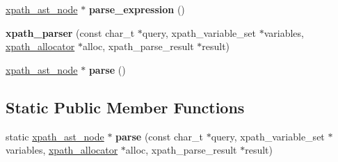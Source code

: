 \begin{DoxyCompactItemize}
\item 
\hypertarget{structxpath__parser_adb814ff3b99621d2a1c8e788ffd1c1c5}{\hyperlink{classxpath__ast__node}{xpath\+\_\+ast\+\_\+node} $\ast$ {\bfseries parse\+\_\+expression} ()}\label{structxpath__parser_adb814ff3b99621d2a1c8e788ffd1c1c5}

\item 
\hypertarget{structxpath__parser_a3f5b4a04f4d0a0a44962d9825a86ed0d}{{\bfseries xpath\+\_\+parser} (const char\+\_\+t $\ast$query, xpath\+\_\+variable\+\_\+set $\ast$variables, \hyperlink{classxpath__allocator}{xpath\+\_\+allocator} $\ast$alloc, xpath\+\_\+parse\+\_\+result $\ast$result)}\label{structxpath__parser_a3f5b4a04f4d0a0a44962d9825a86ed0d}

\item 
\hypertarget{structxpath__parser_a581e576958037e1ab682fb952b3ada38}{\hyperlink{classxpath__ast__node}{xpath\+\_\+ast\+\_\+node} $\ast$ {\bfseries parse} ()}\label{structxpath__parser_a581e576958037e1ab682fb952b3ada38}

\end{DoxyCompactItemize}
\subsection*{Static Public Member Functions}
\begin{DoxyCompactItemize}
\item 
\hypertarget{structxpath__parser_ab865a9a777b466365b3c4bd50290189d}{static \hyperlink{classxpath__ast__node}{xpath\+\_\+ast\+\_\+node} $\ast$ {\bfseries parse} (const char\+\_\+t $\ast$query, xpath\+\_\+variable\+\_\+set $\ast$variables, \hyperlink{classxpath__allocator}{xpath\+\_\+allocator} $\ast$alloc, xpath\+\_\+parse\+\_\+result $\ast$result)}\label{structxpath__parser_ab865a9a777b466365b3c4bd50290189d}

\end{DoxyCompactItemize}
